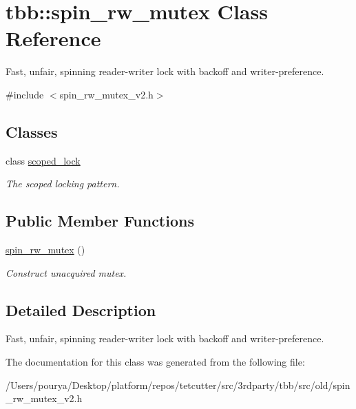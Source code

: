 \hypertarget{classtbb_1_1spin__rw__mutex}{}\section{tbb\+:\+:spin\+\_\+rw\+\_\+mutex Class Reference}
\label{classtbb_1_1spin__rw__mutex}


Fast, unfair, spinning reader-\/writer lock with backoff and writer-\/preference.  




{\ttfamily \#include $<$spin\+\_\+rw\+\_\+mutex\+\_\+v2.\+h$>$}

\subsection*{Classes}
\begin{DoxyCompactItemize}
\item 
class \hyperlink{classtbb_1_1spin__rw__mutex_1_1scoped__lock}{scoped\+\_\+lock}
\begin{DoxyCompactList}\small\item\em The scoped locking pattern. \end{DoxyCompactList}\end{DoxyCompactItemize}
\subsection*{Public Member Functions}
\begin{DoxyCompactItemize}
\item 
\hypertarget{classtbb_1_1spin__rw__mutex_a89f5fac1aed4a2eb2e5a1241b43a9380}{}\hyperlink{classtbb_1_1spin__rw__mutex_a89f5fac1aed4a2eb2e5a1241b43a9380}{spin\+\_\+rw\+\_\+mutex} ()\label{classtbb_1_1spin__rw__mutex_a89f5fac1aed4a2eb2e5a1241b43a9380}

\begin{DoxyCompactList}\small\item\em Construct unacquired mutex. \end{DoxyCompactList}\end{DoxyCompactItemize}


\subsection{Detailed Description}
Fast, unfair, spinning reader-\/writer lock with backoff and writer-\/preference. 



The documentation for this class was generated from the following file\+:\begin{DoxyCompactItemize}
\item 
/\+Users/pourya/\+Desktop/platform/repos/tetcutter/src/3rdparty/tbb/src/old/spin\+\_\+rw\+\_\+mutex\+\_\+v2.\+h\end{DoxyCompactItemize}
